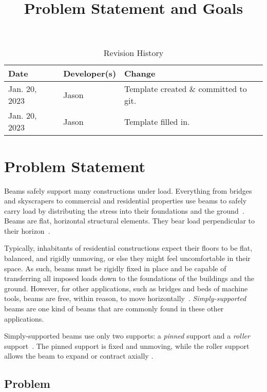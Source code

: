 \documentclass{article}
\title{Problem Statement and Goals\\\progname{}}
\author{\authname}
\date{}
\begin{document}
\maketitle

\begin{table}[hp]
    \caption{Revision History} \label{TblRevisionHistory}
    \begin{tabularx}{\textwidth}{llX}
        \toprule
        \textbf{Date} & \textbf{Developer(s)} & \textbf{Change}                       \\
        \midrule
        Jan. 20, 2023 & Jason                 & Template created \& committed to git. \\
        Jan. 20, 2023 & Jason                 & Template filled in.                   \\
        \bottomrule
    \end{tabularx}
\end{table}

\section{Problem Statement}
\label{problem-statement}

Beams safely support many constructions under load. Everything from bridges and
skyscrapers to commercial and residential properties use beams to safely carry
load by distributing the stress into their foundations and the ground\
\cite{Moscovitch2020}. Beams are flat, horizontal structural elements. They bear
load perpendicular to their horizon\ \cite{Moscovitch2020}.

Typically, inhabitants of residential constructions expect their floors to be
flat, balanced, and rigidly unmoving, or else they might feel uncomfortable in
their space. As such, beams must be rigidly fixed in place and be capable of
transferring all imposed loads down to the foundations of the buildings and the
ground. However, for other applications, such as bridges and beds of machine
tools, beams are free, within reason, to move horizontally\
\cite{BirdChivers1993}. \textit{Simply-supported} beams are one kind of beams
that are commonly found in these other applications.

Simply-supported beams use only two supports: a \textit{pinned} support and a
\textit{roller} support\ \cite{Lemonis2022}. The pinned support is fixed and
unmoving, while the roller support allows the beam to expand or contract axially
\cite{Lemonis2022}.

\subsection{Problem}
\label{problem-statement:problem}
\end{document}
